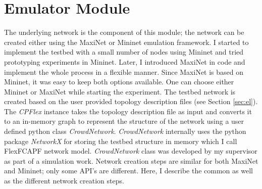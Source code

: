 \section{Emulator Module}\label{sec:emmod}
The underlying network is the component of this module; the network can be created either using the MaxiNet or Mininet emulation framework. I started to implement the testbed with a small number of nodes using Mininet and tried prototyping experiments in Mininet. Later, I introduced MaxiNet in code and implement the whole process in a flexible manner. Since MaxiNet is based on Mininet, it was easy to keep both options available. One can choose either Mininet or MaxiNet while starting the experiment. The testbed network is created based on the user provided topology description files (see Section \ref{sec:el}). The \textit{CPFlex} instance takes the topology description file as input and converts it to an in-memory graph to represent the structure of the network using a user defined python class \textit{CrowdNetwork}. \textit{CrowdNetwork} internally uses the python package \textit{NetworkX} for storing the testbed structure in memory which I call FlexFCAPF network model. \textit{CrowdNetwork} class was developed by my supervisor as part of a simulation work. Network creation steps are similar for both MaxiNet and Mininet; only some API's are different. Here, I describe the common as well as the different network creation steps.

